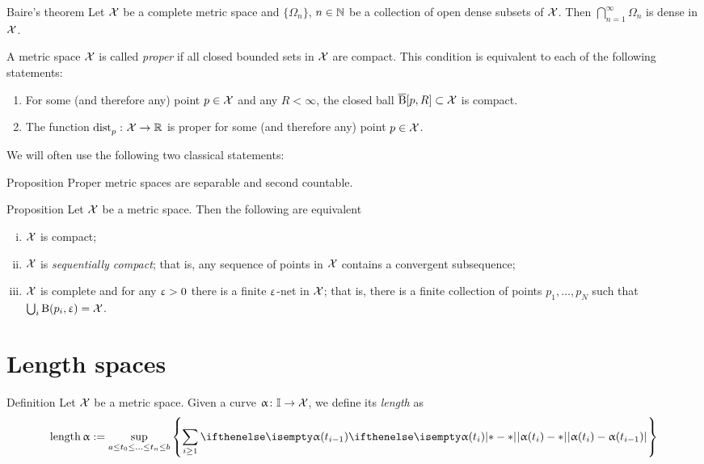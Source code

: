 \begin{thm}{Baire's theorem}
Let $\mathcal{X}$ be a complete metric space 
and $\{\Omega_n\}$, $n\in \NN$ be a collection of open dense subsets of $\mathcal{X}$.
Then $\bigcap_{n=1}^\infty\Omega_n$ is dense in $\mathcal{X}$.
\end{thm}
 

A metric space $\mathcal{X}$ is called \emph{proper} if all closed bounded sets in $\mathcal{X}$ are compact. 
This condition is equivalent to each of the following statements:
\begin{enumerate}
\item For some (and therefore any) point $p\in \spc{X}$ and any $R<\infty$, 
the closed ball $\cBall[p,R]\subset\spc{X}$ is compact. 
\item The function $\distfun{p}{}{}\:\spc{X}\to\RR$ is proper for some (and therefore any) point $p\in \spc{X}$.
\end{enumerate}

We will often use the following two classical statements:

\begin{thm}{Proposition}
Proper metric spaces are separable and second countable.
\end{thm}



\begin{thm}{Proposition}\label{compact=seq-compact}
Let $\mathcal{X}$ be a metric space. Then the following are equivalent
\begin{enumerate}[i)]
\item $\mathcal{X}$ is compact;
\item $\mathcal{X}$ is \emph{sequentially compact}; that is, any sequence of points in $\mathcal{X}$ contains a convergent subsequence;
\item $\mathcal{X}$ is complete and for any $\upvarepsilon>0$ there is a finite $\upvarepsilon$-net in $\mathcal{X}$; that is, there is a finite collection of points $p_1,\ldots,p_{N}$ such that $\bigcup_i\mathrm{B}{}(p_i,\upvarepsilon)=\mathcal{X}$.
\end{enumerate}
\end{thm}

\section{Length spaces}\label{sec:intrinsic}

\begin{thm}{Definition}\label{def:length}
Let $\mathcal{X}$ be a metric space.
Given a curve $\alpha\: \II\to \spc{X}$, we define its \emph{length} as 
\[
\length \alpha \df \sup_{a\le t_0\le\ldots\le t_n\le b}\left\{\sum_{i\ge 1} \dist{\alpha(t_i)}{\alpha (t_{i-1})}{}\right\}
\]
\end{thm}

